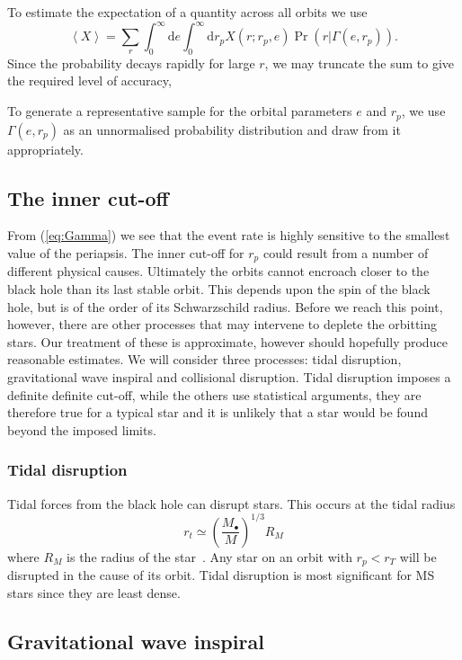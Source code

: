 \documentclass[useAMS,usedcolumn,usegraphicx,usenatbib]{mn2e}
\newcommand{\eqnref}[1]{(\ref{eq:#1})}
\newcommand{\dd}{\ensuremath{\mathrm{d}}}
\begin{document}
To estimate the expectation of a quantity across all orbits we use
\begin{equation}
\left\langle X\right\rangle = \sum_r \int_0^\infty \dd e \int_0^\infty \dd r_p X(r;r_p,e)\Pr(r|\Gamma(e, r_p)).
\end{equation}
Since the probability decays rapidly for large $r$, we may truncate the sum to give the required level of accuracy,

To generate a representative sample for the orbital parameters $e$ and $r_p$, we use $\Gamma(e, r_p)$ as an unnormalised probability distribution and draw from it appropriately.

\subsection{The inner cut-off}

From \eqnref{Gamma} we see that the event rate is highly sensitive to the smallest value of the periapsis. The inner cut-off for $r_p$ could result from a number of different physical causes. Ultimately the orbits cannot encroach closer to the black hole than its last stable orbit. This depends upon the spin of the black hole, but is of the order of its Schwarzschild radius. Before we reach this point, however, there are other processes that may intervene to deplete the orbitting stars. Our treatment of these is approximate, however should hopefully produce reasonable estimates. We will consider three processes: tidal disruption, gravitational wave inspiral and collisional disruption. Tidal disruption imposes a definite definite cut-off, while the others use statistical arguments, they are therefore true for a typical star and it is unlikely that a star would be found beyond the imposed limits.

\subsubsection{Tidal disruption}

Tidal forces from the black hole can disrupt stars. This occurs at the tidal radius
\begin{equation}
r_t \simeq \left(\frac{M_\bullet}{M}\right)^{1/3}R_M
\end{equation}
where $R_M$ is the radius of the star~\citep{Kobayashi2004}. Any star on an orbit with $r_p < r_T$ will be disrupted in the cause of its orbit. Tidal disruption is most significant for MS stars since they are least dense.

\subsection{Gravitational wave inspiral}
\end{document}
